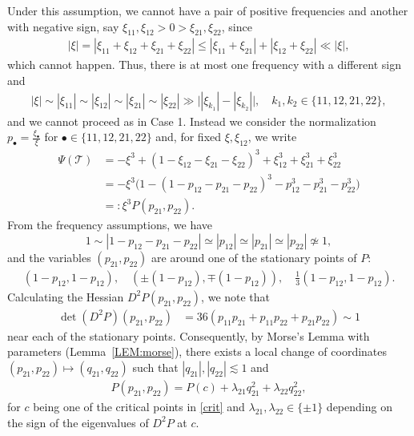 \documentclass[a4paper,
11pt,  reqno]{amsart}
\newcommand{\5}{\textup{V}}
\newcommand{\les}{\lesssim}
\theoremstyle{remark}
\newcommand{\bul}{\bullet}
\newcommand{\TT}{\mathcal{T}}
\newcommand{\ld}{\lambda}
\numberwithin{equation}{section}
\numberwithin{theorem}{section}
\begin{document}
Under this assumption, we cannot have a pair of positive frequencies and another with negative sign, say $\xi_{11},\xi_{12}>0>\xi_{21}, \xi_{22}$, since
\begin{align}
    |\xi| = |\xi_{11} + \xi_{12} + \xi_{21} + \xi_{22} | 
    \le |\xi_{11} + \xi_{21}| + |\xi_{12} + \xi_{22}| \ll |\xi|, 
\end{align}
which cannot happen. Thus, there is at most one frequency with a different sign and 
\begin{align}
   |\xi|\sim |\xi_{11}| \sim |\xi_{12}| \sim |\xi_{21}| \sim |\xi_{22}| \gg 
    \big| |\xi_{k_1}| - |\xi_{k_2}| \big|, \quad k_1,k_2 \in \{11,12,21,22\}, 
\end{align}
and we cannot proceed as in Case 1. Instead we consider the normalization $p_\bul = \frac{\xi_\bul}{\xi}$ for $\bul\in\{11, 12, 21, 22\}$ and, for fixed $\xi, \xi_{12}$, we write
\begin{align}
    \Psi(\TT) 
    &
    =  - \xi^3 + (1-\xi_{12} - \xi_{21} - \xi_{22})^3 + \xi_{12}^3 +  \xi_{21}^3 +  \xi_{22}^3 
    \\
    &
    =
     - \xi^3 \big( 1 - (1-p_{12} - p_{21}-p_{22})^3 - p_{12}^3 - p_{21}^3 - p_{22}^3 \big)
    \\
    & = : \xi^3 P(p_{21}, p_{22} ).
\end{align}
From the frequency assumptions, we have 
$$1\sim |1 - p_{12}-p_{21} - p_{22}| \simeq |p_{12}| \simeq |p_{21} |\simeq |p_{22}|\not\simeq 1,$$
and the variables $(p_{21}, p_{22})$ are around one of the stationary points of $P$:
\begin{align}\label{crit}
    (1-p_{12}, 1-p_{12}), \quad (\pm(1-p_{12}), \mp(1-p_{12})), \quad \tfrac13(1-p_{12}, 1-p_{12}). 
\end{align}
Calculating the Hessian $D^2 P(p_{21}, p_{22})$, we note that 
\begin{align}
 \det(D^2 P)(p_{21}, p_{22}) 
 &
 = 36 (p_{11} p_{21} + p_{11} p_{22} + p_{21} p_{22} ) \sim 1
\end{align}
near each of the stationary points. 
Consequently, by Morse's Lemma with parameters (Lemma~\ref{LEM:morse}), there exists a local change of coordinates $( p_{21}, p_{22}) \mapsto (q_{21}, q_{22})$ such that $|q_{21}|, |q_{22}| \les 1 $ and 
\begin{align}
P(p_{21}, p_{22})
 = P(c) + \ld_{21} q_{21}^2 + \ld_{22} q_{22}^2,
\end{align}
for $c$ being one of the critical points in \eqref{crit} and $\ld_{21}, \ld_{22} \in \{\pm1\}$ depending on the sign of the eigenvalues of $D^2P$ at $c$.
\end{document}
